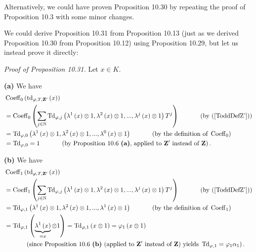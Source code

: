\documentclass[numbers=enddot,12pt,final,onecolumn,notitlepage]{scrartcl}%
\begin{document}
Alternatively, we could have proven Proposition 10.30 by repeating the proof
of Proposition 10.3 with some minor changes.

We could derive Proposition 10.31 from Proposition 10.13 (just as we derived
Proposition 10.30 from Proposition 10.12) using Proposition 10.29, but let us
instead prove it directly:

\textit{Proof of Proposition 10.31.} Let $x\in K$.

\textbf{(a)} We have%
\begin{align*}
&  \operatorname*{Coeff}\nolimits_{0}\left(  \operatorname*{td}%
\nolimits_{\varphi,T,\mathbf{Z}^{\prime}}\left(  x\right)  \right) \\
&  =\operatorname*{Coeff}\nolimits_{0}\left(  \sum_{j\in\mathbb{N}%
}\operatorname*{Td}\nolimits_{\varphi,j}\left(  \lambda^{1}\left(  x\right)
\otimes1,\lambda^{2}\left(  x\right)  \otimes1,...,\lambda^{j}\left(
x\right)  \otimes1\right)  T^{j}\right)  \ \ \ \ \ \ \ \ \ \ \left(  \text{by
(\ref{ToddDefZ'})}\right) \\
&  =\operatorname*{Td}\nolimits_{\varphi,0}\left(  \lambda^{1}\left(
x\right)  \otimes1,\lambda^{2}\left(  x\right)  \otimes1,...,\lambda
^{0}\left(  x\right)  \otimes1\right)  \ \ \ \ \ \ \ \ \ \ \left(  \text{by
the definition of }\operatorname*{Coeff}\nolimits_{0}\right) \\
&  =\operatorname*{Td}\nolimits_{\varphi,0}=1\ \ \ \ \ \ \ \ \ \ \left(
\text{by Proposition 10.6 \textbf{(a)}, applied to }\mathbf{Z}^{\prime}\text{
instead of }\mathbf{Z}\right)  .
\end{align*}


\textbf{(b)} We have%
\begin{align*}
&  \operatorname*{Coeff}\nolimits_{1}\left(  \operatorname*{td}%
\nolimits_{\varphi,T,\mathbf{Z}^{\prime}}\left(  x\right)  \right) \\
&  =\operatorname*{Coeff}\nolimits_{1}\left(  \sum_{j\in\mathbb{N}%
}\operatorname*{Td}\nolimits_{\varphi,j}\left(  \lambda^{1}\left(  x\right)
\otimes1,\lambda^{2}\left(  x\right)  \otimes1,...,\lambda^{j}\left(
x\right)  \otimes1\right)  T^{j}\right)  \ \ \ \ \ \ \ \ \ \ \left(  \text{by
(\ref{ToddDefZ'})}\right) \\
&  =\operatorname*{Td}\nolimits_{\varphi,1}\left(  \lambda^{1}\left(
x\right)  \otimes1,\lambda^{2}\left(  x\right)  \otimes1,...,\lambda
^{1}\left(  x\right)  \otimes1\right)  \ \ \ \ \ \ \ \ \ \ \left(  \text{by
the definition of }\operatorname*{Coeff}\nolimits_{1}\right) \\
&  =\operatorname*{Td}\nolimits_{\varphi,1}\left(  \underbrace{\lambda
^{1}\left(  x\right)  }_{=x}\otimes1\right)  =\operatorname*{Td}%
\nolimits_{\varphi,1}\left(  x\otimes1\right)  =\varphi_{1}\left(
x\otimes1\right) \\
&  \ \ \ \ \ \ \ \ \ \ \left(  \text{since Proposition 10.6 \textbf{(b)}
(applied to }\mathbf{Z}^{\prime}\text{ instead of }\mathbf{Z}\text{) yields
}\operatorname*{Td}\nolimits_{\varphi,1}=\varphi_{1}\alpha_{1}\right)  .
\end{align*}
\end{document}

